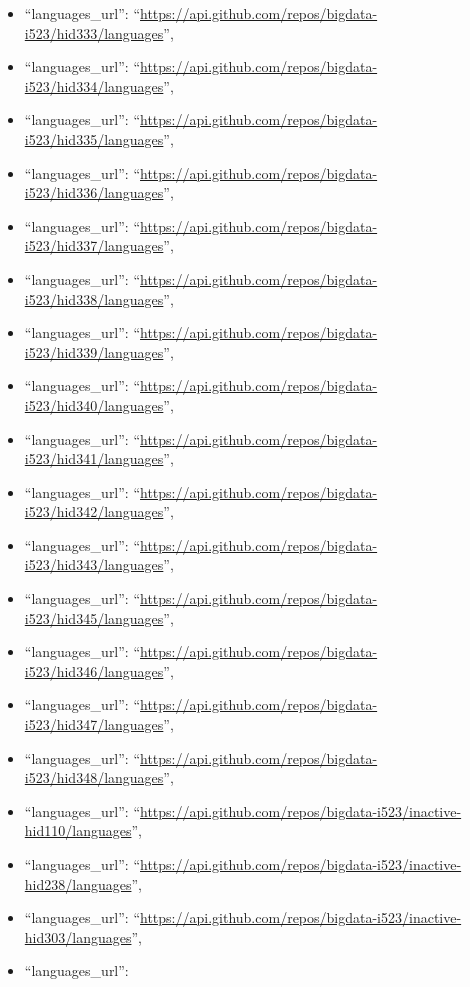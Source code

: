 \begin{itemize}
\item
  ``languages\_url'':
  ``\url{https://api.github.com/repos/bigdata-i523/hid333/languages}'',
\item
  ``languages\_url'':
  ``\url{https://api.github.com/repos/bigdata-i523/hid334/languages}'',
\item
  ``languages\_url'':
  ``\url{https://api.github.com/repos/bigdata-i523/hid335/languages}'',
\item
  ``languages\_url'':
  ``\url{https://api.github.com/repos/bigdata-i523/hid336/languages}'',
\item
  ``languages\_url'':
  ``\url{https://api.github.com/repos/bigdata-i523/hid337/languages}'',
\item
  ``languages\_url'':
  ``\url{https://api.github.com/repos/bigdata-i523/hid338/languages}'',
\item
  ``languages\_url'':
  ``\url{https://api.github.com/repos/bigdata-i523/hid339/languages}'',
\item
  ``languages\_url'':
  ``\url{https://api.github.com/repos/bigdata-i523/hid340/languages}'',
\item
  ``languages\_url'':
  ``\url{https://api.github.com/repos/bigdata-i523/hid341/languages}'',
\item
  ``languages\_url'':
  ``\url{https://api.github.com/repos/bigdata-i523/hid342/languages}'',
\item
  ``languages\_url'':
  ``\url{https://api.github.com/repos/bigdata-i523/hid343/languages}'',
\item
  ``languages\_url'':
  ``\url{https://api.github.com/repos/bigdata-i523/hid345/languages}'',
\item
  ``languages\_url'':
  ``\url{https://api.github.com/repos/bigdata-i523/hid346/languages}'',
\item
  ``languages\_url'':
  ``\url{https://api.github.com/repos/bigdata-i523/hid347/languages}'',
\item
  ``languages\_url'':
  ``\url{https://api.github.com/repos/bigdata-i523/hid348/languages}'',
\item
  ``languages\_url'':
  ``\url{https://api.github.com/repos/bigdata-i523/inactive-hid110/languages}'',
\item
  ``languages\_url'':
  ``\url{https://api.github.com/repos/bigdata-i523/inactive-hid238/languages}'',
\item
  ``languages\_url'':
  ``\url{https://api.github.com/repos/bigdata-i523/inactive-hid303/languages}'',
\item
  ``languages\_url'':

\end{itemize}

